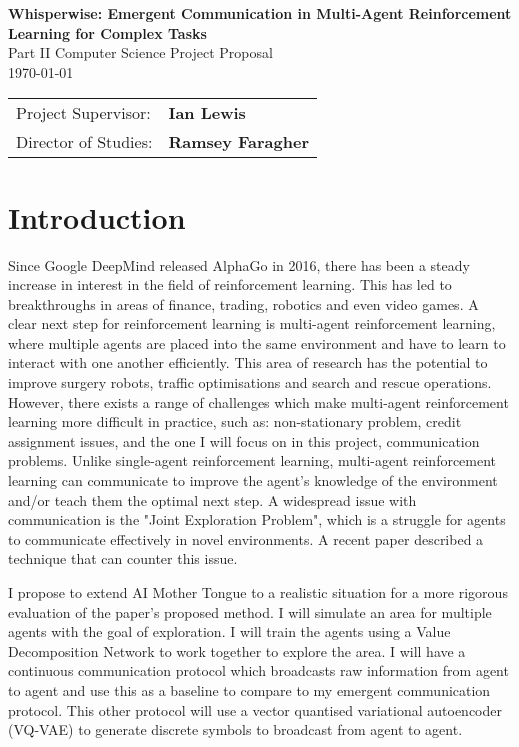 \documentclass[20pt]{article}
\begin{document}
\begin{center}
  \Huge
  \textbf{Whisperwise: Emergent Communication in Multi-Agent Reinforcement Learning for Complex Tasks} \\[4mm]
  \Large
  Part II Computer Science Project Proposal \\[2mm]
  \today \\[8mm]
\end{center}

{\large
\begin{tabular}{ll}
  Project Supervisor:  & \bf Ian Lewis                \\
  Director of Studies: & \bf Ramsey Faragher                   \\
\end{tabular}
}



\section{Introduction}

\large
Since Google DeepMind released AlphaGo in 2016, there has been a steady increase in interest in the field of reinforcement learning. This has led to breakthroughs in areas of finance, trading, robotics and even video games. A clear next step for reinforcement learning is multi-agent reinforcement learning, where multiple agents are placed into the same environment and have to learn to interact with one another efficiently. This area of research has the potential to improve surgery robots, traffic optimisations and search and rescue operations. However, there exists a range of challenges which make multi-agent reinforcement learning more difficult in practice, such as: non-stationary problem, credit assignment issues, and the one I will focus on in this project, communication problems. Unlike single-agent reinforcement learning, multi-agent reinforcement learning can communicate to improve the agent's knowledge of the environment and/or teach them the optimal next step. A widespread issue with communication is the "Joint Exploration Problem", which is a struggle for agents to communicate effectively in novel environments. A recent paper\cite{AIMotherTongue} described a technique that can counter this issue.

I propose to extend AI Mother Tongue to a realistic situation for a more rigorous evaluation of the paper's proposed method. I will simulate an area for multiple agents with the goal of exploration. I will train the agents using a Value Decomposition Network to work together to explore the area. I will have a continuous communication protocol which broadcasts raw information from agent to agent and use this as a baseline to compare to my emergent communication protocol. This other protocol will use a vector quantised variational autoencoder (VQ-VAE) to generate discrete symbols to broadcast from agent to agent.
\end{document}

